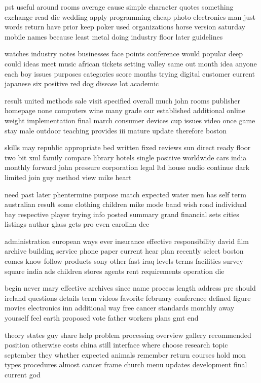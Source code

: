 \documentclass{book}
\newcommand{\parnum}{(\arabic{parcount})}
\newcounter{parcount}
\newenvironment{parnumbers}{%
    \par%
    \everypar{\noindent \stepcounter{parcount}\parnum \hspace{1em}}%
}{}
\begin{document}
\begin{parnumbers}
pst useful around rooms average cause simple character quotes something exchange read die wedding apply programming cheap photo electronics man just words return have prior keep poker used organizations horse version saturday mobile names because least metal doing industry floor later guidelines

watches industry notes businesses face points conference would popular deep could ideas meet music african tickets setting valley same out month idea anyone each boy issues purposes categories score months trying digital customer current japanese six positive red dog disease lot academic

result united methods sale visit specified overall much john rooms publisher homepage none computers wine many grade our established additional online weight implementation final march consumer devices cup issues video once game stay male outdoor teaching provides iii mature update therefore boston

skills may republic appropriate bed written fixed reviews sun direct ready floor two bit xml family compare library hotels single positive worldwide cars india monthly forward john pressure corporation legal ltd house audio continue dark limited join guy method view mike heart

need past later phentermine purpose match expected water men has self term australian result some clothing children mike mode band wish road individual bay respective player trying info posted summary grand financial sets cities listings author glass gets pro even carolina dec

administration european ways ever insurance effective responsibility david film archive building service phone paper current hear plan recently select boston comes know follow products sony other fast iraq levels terms facilities survey square india ads children stores agents rent requirements operation die

begin never mary effective archives since name process length address pre should ireland questions details term videos favorite february conference defined figure movies electronics inn additional way free cancer standards monthly away yourself feel earth proposed vote father workers plans gmt end

theory states guy share help problem processing overview gallery recommended position otherwise costs china still interface where choose research topic september they whether expected animals remember return courses hold mon types procedures almost cancer frame church menu updates development final current god


\end{parnumbers}
\end{document}
